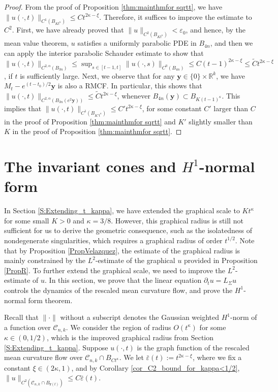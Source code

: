 \documentclass[11pt]{amsart}
\numberwithin{equation}{section}
\numberwithin{equation}{section}
\newcommand{\eps}{\varepsilon}
\newcommand{\br}{\mathbf{r}}
\newcommand{\cC}{\mathcal{C}}
\newcommand{\R}{\mathbb{R}}
\begin{document}
	\begin{proof}
		From the proof of Proposition \ref{thm:mainthmfor sqrtt}, we have $\|u(\cdot,t)\|_{C^1(B_{ K t^\kappa})}\leq Ct^{2\kappa-\xi}$. Therefore, it suffices to improve the estimate to $C^2$. First, we have already proved that $\|u\|_{C^2(B_{ K t^\kappa})}<\eps_0$, and hence, by the mean value theorem, $u$ satisfies a uniformly parabolic PDE in $B_{4n}$, and then we can apply the interior parabolic Schauder estimate to show that $\|u(\cdot,t)\|_{C^{2,\alpha}(B_{3n})}\leq \sup_{s\in[t-1,t]}\|u(\cdot,s)\|_{C^0(B_{4n})}\leq C(t-1)^{2\kappa-\xi}\leq \tilde C t^{2\kappa-\xi}$, if $t$ is sufficiently large. Next, we observe that for any $\mathbf{y}\in\{0\}\times\R^k$, we have $M_t-e^{(t-t_0)/2}\mathbf{y}$ is also a RMCF. In particular, this shows that $\|u(\cdot,t)\|_{C^{2,\alpha}(B_{3n}(e^2\mathbf{y}))}\leq \tilde C t^{2\kappa-\xi}$, whenever $B_{4n}(\mathbf{y})\subset B_{K(t-1)^{\kappa}}$. This implies that $\|u(\cdot,t)\|_{C^1(B_{ K' t^\kappa})}\leq C't^{2\kappa-\xi}$, for some constant $C'$ larger than $C$ in the proof of Proposition \ref{thm:mainthmfor sqrtt} and $K'$ slightly smaller than $K$ in the proof of Proposition \ref{thm:mainthmfor sqrtt}.
	\end{proof}
	
	
	\section{The invariant cones and $H^1$-normal form}\label{SDynamics}
	In Section \ref{S:Extending_t_kappa}, we have extended the graphical scale to $Kt^\kappa$ for some small $K>0$ and $\kappa=3/8$. However, this graphical radius is still not sufficient for us to derive the geometric consequence, such as the isolatedness of nondegenerate singularities, which requires a graphical radius of order $t^{1/2}$.  Note that by Proposition \ref{PropVelazquez}, the estimate of the graphical radius is mainly constrained by the $L^2$-estimate of the graphical $u$ provided in Proposition \ref{PropR}. To further extend the graphical scale, we need to improve the $L^2$-estimate of $u$. In this section, we prove that the linear equation $\partial_t u=L_\Sigma u$ controls the dynamics of the rescaled mean curvature flow, and prove the $H^1$-normal form theorem. 
	
	Recall that $\|\cdot\|$ without a subscript denotes the Gaussian weighted $H^1$-norm of a function over $\cC_{n,k}$. We consider the region of radius $O(t^\kappa)$ for some $\kappa\in(0,1/2)$, which is the improved graphical radius from Section \ref{S:Extending_t_kappa}. Suppose $u(\cdot,t)$ is the graph function of the rescaled mean curvature flow over $\cC_{n,k}\cap B_{Ct^\kappa}$. We let $\bar \eps(t):=t^{2\kappa-\xi}$, where we fix a constant $\xi\in(2\kappa,1)$, and by Corollary \ref{cor_C2_bound_for_kappa<1/2}, $\|u\|_{C^2(\cC_{n,k}\cap B_{\br(t)})}\leq C\bar \eps(t)$.
	
\end{document}
